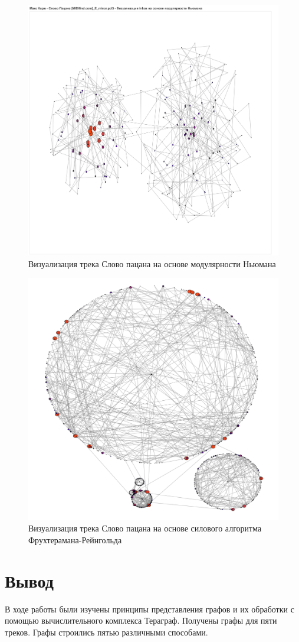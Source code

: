 \documentclass{article}
\begin{document}
\begin{figure}[h]
	\centering
	\includegraphics[scale=0.6]{tools/korj_1.png}
	\caption{Визуализация трека Слово пацана на основе модулярности Ньюмана}
\end{figure}

\begin{figure}[h]
	\centering
	\includegraphics[scale=0.6]{tools/korj_2.png}
	\caption{Визуализация трека Слово пацана на основе силового алгоритма Фрухтерамана-Рейнгольда}
\end{figure}

\clearpage\section{Вывод}

В ходе работы были изучены принципы представления графов и их обработки с помощью вычислительного комплекса 
Тераграф. Получены графы для пяти треков. Графы строились пятью различными способами.
\end{document}
